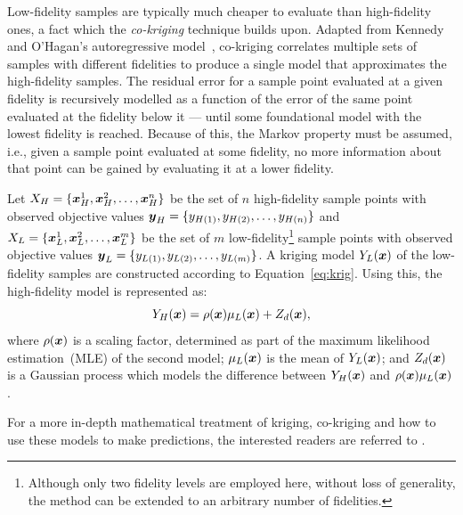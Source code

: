 
Low-fidelity samples are typically much cheaper to evaluate than high-fidelity ones, a fact which the \emph{co-kriging} technique builds upon. Adapted from Kennedy and O'Hagan's autoregressive model~\cite{kennedy2000predicting}, co-kriging correlates multiple sets of samples with different fidelities to produce a single model that approximates the high-fidelity samples. The residual error for a sample point evaluated at a given fidelity is recursively modelled as a function of the error of the same point evaluated at the fidelity below it --- until some foundational model with the lowest fidelity is reached. Because of this, the Markov property must be assumed, i.e., given a sample point evaluated at some fidelity, no more information about that point can be gained by evaluating it at a lower fidelity.

Let $X_H = \{\boldsymbol{x}_H^1,\boldsymbol{x}_H^2,\dots,\boldsymbol{x}_H^n\}$ be the set of $n$ high-fidelity sample points with observed objective values $\boldsymbol{y}_H = \{y_{H(1)},y_{H(2)},\dots,y_{H(n)}\}$ and $X_L = \{\boldsymbol{x}_L^1,\boldsymbol{x}_L^2,\dots,\boldsymbol{x}_L^m\}$ be the set of $m$ low-fidelity\footnote{Although only two fidelity levels are employed here, without loss of generality, the method can be extended to an arbitrary number of fidelities.} sample points with observed objective values $\boldsymbol{y}_L = \{y_{L(1)},y_{L(2)},\dots,y_{L(m)}\}$. A kriging model $Y_L(\boldsymbol{x})$ of the low-fidelity samples are constructed according to Equation~\ref{eq:krig}. Using this, the high-fidelity model is represented as:
\begin{equation}
Y_H(\boldsymbol{x}) = \rho(\boldsymbol{x})\mu_L(\boldsymbol{x}) + Z_d(\boldsymbol{x}),
\end{equation} 
where $\rho(\boldsymbol{x})$ is a scaling factor, determined as part of the maximum likelihood estimation~(MLE) of the second model; $\mu_L(\boldsymbol{x})$ is the mean of $Y_L(\boldsymbol{x})$; and $Z_d(\boldsymbol{x})$ is a Gaussian process which models the difference between $Y_H(\boldsymbol{x})$ and $\rho(\boldsymbol{x})\mu_L(\boldsymbol{x})$.

For a more in-depth mathematical treatment of kriging, co-kriging and how to use these models to make predictions, the interested readers are referred to \cite{forrester2008engineering,forrester2007multi,kennedy2001bayesian,kennedy2000predicting}.

